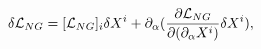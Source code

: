 \begin{equation}
\delta {\cal L}_{NG} = [{\cal L}_{NG}]_i \delta X^i +
\partial_\alpha({\partial{\cal L}_{NG}\over \partial (\partial_\alpha
X^i)}\delta X^i) ,
\end{equation}

